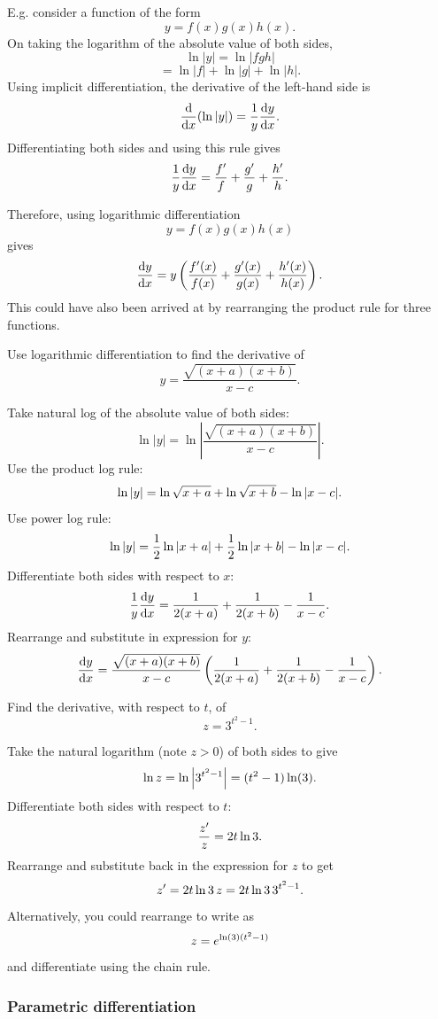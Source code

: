 E.g. consider a function of the form
\[
y=f(x)g(x)h(x).
\]
On taking the logarithm of the absolute value of both sides,
\[
\ln |y|=\ln|fgh|
\]
\[
=\ln| f|+\ln |g|+\ln |h|.
\]
Using implicit differentiation, the derivative of the left-hand side is
\[
\frac{{\rm d} }{{\rm d} x}(\ln |y|)=\frac{1}{y}\frac{{\rm d} y}{{\rm d} x}.
\]
Differentiating both sides and using this rule gives
\[
\frac{1}{y}\frac{{\rm d} y}{{\rm d} x}=\frac{f'}{f}+\frac{g'}{g}+\frac{h'}{h}.
\]

Therefore, using logarithmic differentiation
\[
y=f(x)g(x)h(x)
\]
gives
\[
\frac{{\rm d} y}{{\rm d} x}=y\left(\frac{f'(x)}{f(x)}+\frac{g'(x)}{g(x)}+\frac{h'(x)}{h(x)}\right).
\]
This could have also been arrived at by rearranging the product rule for three functions.

\goodbreak
\begin{example}[Lecture]
Use logarithmic differentiation to find the derivative of
\[
y=\frac{\sqrt{(x+a)(x+b)}}{x-c}.
\]
\end{example}
%
\begin{solution}
Take natural log of the absolute value of both sides:
\[
\ln |y|=\ln\left|\frac{\sqrt{(x+a)(x+b)}}{x-c}\right|.
\]
Use the product log rule:
\[
\ln |y|=\ln\sqrt{x+a}+\ln\sqrt{x+b}-\ln|x-c|.
\]
Use power log rule:
\[
\ln |y|=\frac{1}{2}\ln|x+a|+\frac{1}{2}\ln|x+b|-\ln|x-c|.
\]
Differentiate both sides with respect to $x$:
\[
\frac{1}{y}\frac{{\rm d} y}{{\rm d} x}=\frac{1}{2(x+a)}+\frac{1}{2(x+b)}-\frac{1}{x-c}.
\]
Rearrange and substitute in expression for $y$:
\[
\frac{{\rm d} y}{{\rm d} x}=\frac{\sqrt{(x+a)(x+b)}}{x-c}\left(\frac{1}{2(x+a)}+\frac{1}{2(x+b)}-\frac{1}{x-c}\right).
\]
\end{solution}

\goodbreak
\begin{example}[Video]
Find the derivative, with respect to $t$, of
\[
z=3^{t^2-1}.
\]
\end{example}
%
\begin{solution}
Take the natural logarithm (note $z > 0$) of both sides to give
\[
\ln z = \ln\left|3^{t^2-1}\right|=(t^2-1)\ln(3).
\]
Differentiate both sides with respect to $t$:
\[
\frac{z'}{z}=2t\ln3.
\]
Rearrange and substitute back in the expression for $z$ to get
\[
z'=2t\ln3\,z=2t\ln3\,3^{t^2-1}.
\]
Alternatively, you could rearrange to write as
\[
z=e^{\ln(3)(t^2-1)}
\]
and differentiate using the chain rule.
\end{solution}

\subsubsection{Parametric differentiation}

